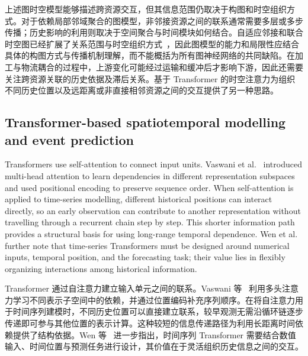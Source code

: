 \documentclass[a4paper,fleqn]{cas-dc}
\newcommand{\zhpara}[1]{%
  \par\begingroup\small\color{black!72}\noindent #1\par\endgroup}
\begin{document}
\zhpara{上述图时空模型能够描述跨资源交互，但其信息范围仍取决于构图和时空组织方式。对于依赖局部邻域聚合的图模型，非邻接资源之间的联系通常需要多层或多步传播；历史影响的利用则取决于空间聚合与时间模块如何结合。自适应邻接和联合时空图已经扩展了关系范围与时空组织方式~\cite{wu2019graphwavenet,song2020stsgcn}，因此图模型的能力和局限性应结合具体的构图方式与传播机制理解，而不能概括为所有图神经网络的共同缺陷。在加工与物流耦合的过程中，上游变化可能经过运输和缓冲后才影响下游，因此还需要关注跨资源关联的历史依据及滞后关系。基于 Transformer 的时空注意力为组织不同历史位置以及远距离或非直接相邻资源之间的交互提供了另一种思路。}

\subsection{Transformer-based spatiotemporal modelling and event prediction}

Transformers use self-attention to connect input units. Vaswani et al.~\cite{vaswani2017attention} introduced multi-head attention to learn dependencies in different representation subspaces and used positional encoding to preserve sequence order. When self-attention is applied to time-series modelling, different historical positions can interact directly, so an early observation can contribute to another representation without travelling through a recurrent chain step by step. This shorter information path provides a structural basis for using long-range temporal dependence. Wen et al.~\cite{wen2023transformers} further note that time-series Transformers must be designed around numerical inputs, temporal position, and the forecasting task; their value lies in flexibly organizing interactions among historical information.

\zhpara{Transformer 通过自注意力建立输入单元之间的联系。Vaswani 等~\cite{vaswani2017attention} 利用多头注意力学习不同表示子空间中的依赖，并通过位置编码补充序列顺序。在将自注意力用于时间序列建模时，不同历史位置可以直接建立联系，较早观测无需沿循环链逐步传递即可参与其他位置的表示计算。这种较短的信息传递路径为利用长距离时间依赖提供了结构依据。Wen 等~\cite{wen2023transformers} 进一步指出，时间序列 Transformer 需要结合数值输入、时间位置与预测任务进行设计，其价值在于灵活组织历史信息之间的交互。}
\end{document}
